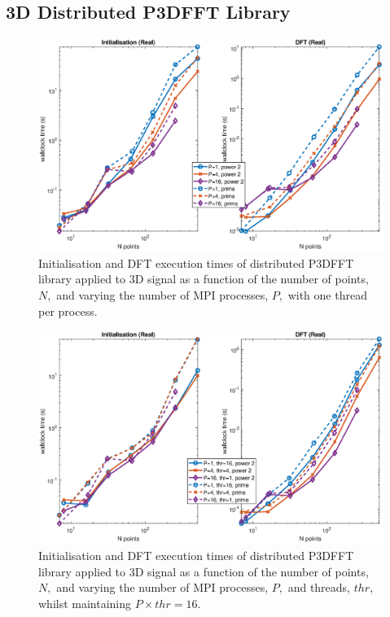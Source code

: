 \documentclass[a4paper]{article}
\begin{document}
\subsection{3D Distributed P3DFFT Library}\label{Sec:3DDistP3DFFT}

\begin{figure}[htb]
    \centering
    \includegraphics[width=0.9\linewidth]{../results/p3dfft_3d_mpi.eps}
  \caption{Initialisation and DFT execution times of distributed P3DFFT library applied to 3D signal as a function of the
    number of points, $N,$ and varying the number of MPI processes, $P,$ with one thread per process.}
  \label{3DDistP3DFFT}
\end{figure}

\begin{figure}[htb]
    \centering
    \includegraphics[width=0.9\linewidth]{../results/p3dfft_3d_mpi_thr.eps}
  \caption{Initialisation and DFT execution times of distributed P3DFFT library applied to 3D signal as a function of the
    number of points, $N,$ and varying the number of MPI processes, $P,$ and threads, $thr,$ whilst maintaining $P\times thr=16.$}
  \label{3DDistP3DFFT16}
\end{figure}
\end{document}
